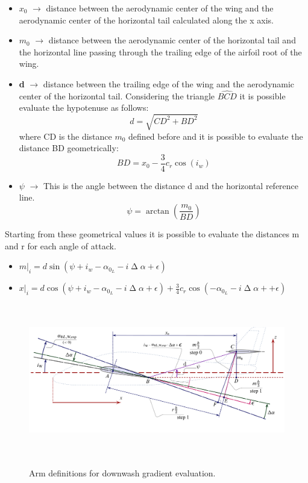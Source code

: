 \begin{itemize}
\item {\bfseries $x_0$}  $\rightarrow$ distance between the aerodynamic center of the wing and the aerodynamic center of the horizontal tail calculated along the x axis.  
\item {\bfseries $m_0$}  $\rightarrow$ distance between the aerodynamic center of the horizontal tail and the horizontal line passing through the trailing edge of the airfoil root of the wing.
\item {\bfseries d}  $\rightarrow$ distance between the trailing edge of the wing and the aerodynamic center of the horizontal tail. Considering the triangle $ \hat{BCD} $ it is possible evaluate the hypotenuse as follows:
\begin{equation}
d= \sqrt{CD^2 + BD^2}
\end{equation} 
where CD is the distance $m_0$ defined before and it is possible to evaluate the distance BD geometrically:
\begin{equation}
BD = x_0 - \frac{3}{4} c_r \cos(i_w)
\end{equation}
\item {\bfseries $\psi$}  $\rightarrow$ This is the angle between the distance d and the horizontal reference line.
\begin{equation}
\psi = \arctan(\frac{m_0}{BD})
\end{equation}
\end{itemize}

Starting from these geometrical values it is possible to evaluate the distances m and r for each angle of attack.

\begin{itemize}
	\item $m|_i = d \sin(\psi + i_w - \alpha_{0_L}- i \upDelta \alpha + \epsilon)$
	\item $x|_i =  d \cos(\psi + i_w - \alpha_{0_L}- i \upDelta \alpha + \epsilon) + \frac{3}{4} c_r \cos(-\alpha_{0_L} - i \upDelta \alpha+ + \epsilon)$
\end{itemize}

\begin{figure}[H]
\centering
{\includegraphics[height=6.69cm]{Immagini/arms_definitions_mod.pdf}} 
\caption{Arm definitions for downwash gradient evaluation.}
\label{armdefinitiondownwa}
\end{figure} 



